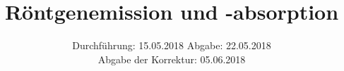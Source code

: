 

\subject{Versuch 602}
\title{Röntgenemission und -absorption}
\date{
  Durchführung: 15.05.2018
  \hspace{3em}
  Abgabe: 22.05.2018\\
	Abgabe der Korrektur: 05.06.2018
}


      \maketitle
      \thispagestyle{empty}
      \tableofcontents
      \newpage
      
      
      
      \newpage
      
      \newpage
      
      
      \printbibliography{}
      
      

